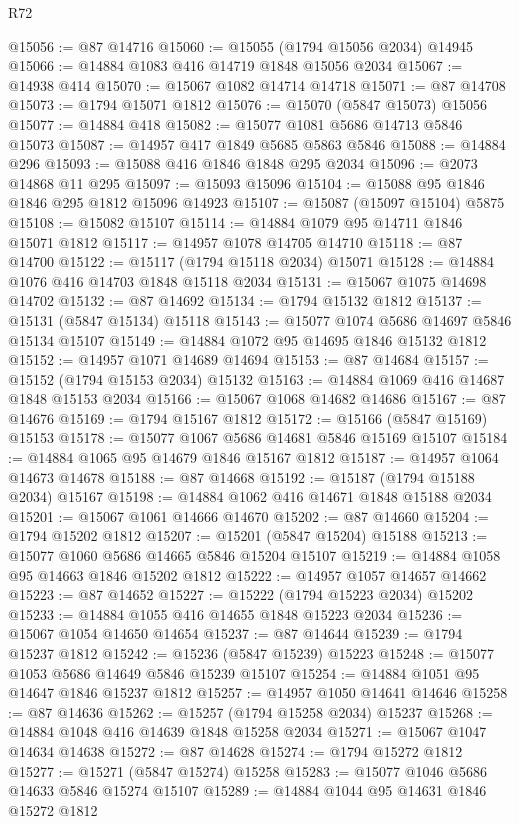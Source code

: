 \begin{lexlean}{R72}
\begin{coremodule}
@15056 := @87 @14716
@15060 := @15055 (@1794 @15056 @2034) @14945
@15066 := @14884 @1083 @416 @14719 @1848 @15056 @2034
@15067 := @14938 @414
@15070 := @15067 @1082 @14714 @14718
@15071 := @87 @14708
@15073 := @1794 @15071 @1812
@15076 := @15070 (@5847 @15073) @15056
@15077 := @14884 @418
@15082 := @15077 @1081 @5686 @14713 @5846 @15073
@15087 := @14957 @417 @1849 @5685 @5863 @5846
@15088 := @14884 @296
@15093 := @15088 @416 @1846 @1848 @295 @2034
@15096 := @2073 @14868 @11 @295
@15097 := @15093 @15096
@15104 := @15088 @95 @1846 @1846 @295 @1812 @15096 @14923
@15107 := @15087 (@15097 @15104) @5875
@15108 := @15082 @15107
@15114 := @14884 @1079 @95 @14711 @1846 @15071 @1812
@15117 := @14957 @1078 @14705 @14710
@15118 := @87 @14700
@15122 := @15117 (@1794 @15118 @2034) @15071
@15128 := @14884 @1076 @416 @14703 @1848 @15118 @2034
@15131 := @15067 @1075 @14698 @14702
@15132 := @87 @14692
@15134 := @1794 @15132 @1812
@15137 := @15131 (@5847 @15134) @15118
@15143 := @15077 @1074 @5686 @14697 @5846 @15134 @15107
@15149 := @14884 @1072 @95 @14695 @1846 @15132 @1812
@15152 := @14957 @1071 @14689 @14694
@15153 := @87 @14684
@15157 := @15152 (@1794 @15153 @2034) @15132
@15163 := @14884 @1069 @416 @14687 @1848 @15153 @2034
@15166 := @15067 @1068 @14682 @14686
@15167 := @87 @14676
@15169 := @1794 @15167 @1812
@15172 := @15166 (@5847 @15169) @15153
@15178 := @15077 @1067 @5686 @14681 @5846 @15169 @15107
@15184 := @14884 @1065 @95 @14679 @1846 @15167 @1812
@15187 := @14957 @1064 @14673 @14678
@15188 := @87 @14668
@15192 := @15187 (@1794 @15188 @2034) @15167
@15198 := @14884 @1062 @416 @14671 @1848 @15188 @2034
@15201 := @15067 @1061 @14666 @14670
@15202 := @87 @14660
@15204 := @1794 @15202 @1812
@15207 := @15201 (@5847 @15204) @15188
@15213 := @15077 @1060 @5686 @14665 @5846 @15204 @15107
@15219 := @14884 @1058 @95 @14663 @1846 @15202 @1812
@15222 := @14957 @1057 @14657 @14662
@15223 := @87 @14652
@15227 := @15222 (@1794 @15223 @2034) @15202
@15233 := @14884 @1055 @416 @14655 @1848 @15223 @2034
@15236 := @15067 @1054 @14650 @14654
@15237 := @87 @14644
@15239 := @1794 @15237 @1812
@15242 := @15236 (@5847 @15239) @15223
@15248 := @15077 @1053 @5686 @14649 @5846 @15239 @15107
@15254 := @14884 @1051 @95 @14647 @1846 @15237 @1812
@15257 := @14957 @1050 @14641 @14646
@15258 := @87 @14636
@15262 := @15257 (@1794 @15258 @2034) @15237
@15268 := @14884 @1048 @416 @14639 @1848 @15258 @2034
@15271 := @15067 @1047 @14634 @14638
@15272 := @87 @14628
@15274 := @1794 @15272 @1812
@15277 := @15271 (@5847 @15274) @15258
@15283 := @15077 @1046 @5686 @14633 @5846 @15274 @15107
@15289 := @14884 @1044 @95 @14631 @1846 @15272 @1812

\end{coremodule}
\end{lexlean}
